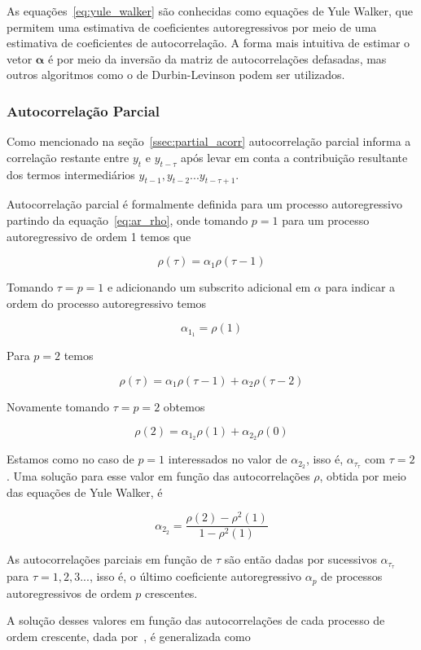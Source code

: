 As equações~\ref{eq:yule_walker} são conhecidas como equações de Yule Walker,
que permitem uma estimativa de coeficientes autoregressivos por meio de uma
estimativa de coeficientes de autocorrelação. A forma mais intuitiva de estimar
o vetor $\mathbf{\alpha}$ é por meio da inversão da matriz de autocorrelações
defasadas, mas outros algoritmos como o de Durbin-Levinson podem ser utilizados.

\subsubsection{Autocorrelação Parcial}

Como mencionado na seção~\ref{ssec:partial_acorr} autocorrelação parcial
informa a correlação restante entre $y_t$ e $y_{t-\tau}$ após levar em
conta a contribuição resultante dos termos intermediários $y_{t-1}, y_{t-2}
... y_{t-\tau+1}$.

Autocorrelação parcial é formalmente definida para um processo autoregressivo
partindo da equação~\ref{eq:ar_rho}, onde tomando $p=1$ para um processo
autoregressivo de ordem 1 temos que

$$ \rho(\tau) = \alpha_1 \rho(\tau - 1) $$

Tomando $\tau = p = 1$ e adicionando um subscrito adicional em $\alpha$ para
indicar a ordem do processo autoregressivo temos

$$ \alpha_{1_{1}} = \rho(1) $$

Para $p=2$ temos

$$ \rho(\tau) = \alpha_1 \rho(\tau - 1) + \alpha_2 \rho(\tau - 2) $$

Novamente tomando $\tau = p = 2$ obtemos

$$ \rho(2) = \alpha_{1_{2}} \rho(1) + \alpha_{2_{2}} \rho(0) $$

Estamos como no caso de $p=1$ interessados no valor de $\alpha_{2_{2}}$, isso é,
$\alpha_{\tau_{\tau}}$ com $\tau=2$. Uma solução para esse valor em função
das autocorrelações $\rho$, obtida por meio das equações de Yule Walker, é

$$ \alpha_{2_{2}} = \frac{\rho(2) - \rho^2(1)}{1 - \rho^2(1)} $$

As autocorrelações parciais em função de $\tau$ são então dadas por sucessivos
$\alpha_{\tau_{\tau}}$ para $\tau = 1, 2, 3 ...$, isso é, o último coeficiente
autoregressivo $\alpha_p$ de processos autoregressivos de ordem $p$ crescentes.

A solução desses valores em função das autocorrelações de cada processo de
ordem crescente, dada por~\cite{morettin}, é generalizada como

